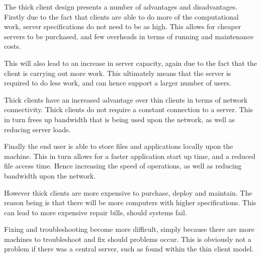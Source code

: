 The thick client design presents a number of advantages and disadvantages. 
Firstly due to the fact that clients are able to do more of the computational 
work, server specifications do not need to be as high. This allows for cheaper 
servers to be purchased, and few overheads in terms of running and maintenance 
costs.

This will also lead to an increase in server capacity, again due to the fact 
that the client is carrying out more work. This ultimately means that the 
server is required to do less work, and can hence support a larger number of 
users.

Thick clients have an increased advantage over thin clients in terms of 
network connectivity. Thick clients do not require a constant connection to a 
server. This in turn frees up bandwidth that is being used upon the network, 
as well as reducing server loads.

Finally the end user is able to store files and applications locally upon the
machine. This in turn allows for a faster application start up time, and a 
reduced file access time. Hence increasing the speed of operations, as well as 
reducing bandwidth upon the network.

However thick clients are more expensive to purchase, deploy and maintain. The 
reason being is that there will be more computers with higher specifications. 
This can lead to more expensive repair bills, should systems fail.

Fixing and troubleshooting become more difficult, simply because there are more
machines to troubleshoot and fix should problems occur. This is obviously not a
problem if there was a central server, such as found within the thin client 
model. 